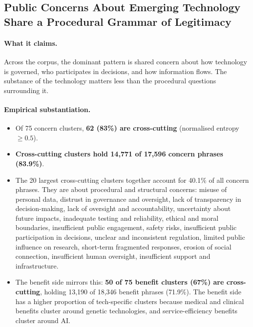 \documentclass[11pt, a4paper]{article}
\begin{document}
\subsection{Public Concerns About Emerging Technology Share a Procedural
Grammar of Legitimacy}

\paragraph{What it claims.}  Across the corpus, the dominant pattern is
shared concern about how technology is governed, who participates in
decisions, and how information flows.  The substance of the technology
matters less than the procedural questions surrounding it.

\paragraph{Empirical substantiation.}

\begin{itemize}
\item Of 75 concern clusters, \textbf{62 (83\%) are cross-cutting}
      (normalised entropy $\geq 0.5$).
\item \textbf{Cross-cutting clusters hold 14,771 of 17,596 concern
      phrases (83.9\%)}.
\item The 20 largest cross-cutting clusters together account for 40.1\%
      of all concern phrases.  They are about procedural and structural
      concerns: misuse of personal data, distrust in governance and
      oversight, lack of transparency in decision-making, lack of
      oversight and accountability, uncertainty about future impacts,
      inadequate testing and reliability, ethical and moral boundaries,
      insufficient public engagement, safety risks, insufficient public
      participation in decisions, unclear and inconsistent regulation,
      limited public influence on research, short-term fragmented
      responses, erosion of social connection, insufficient human
      oversight, insufficient support and infrastructure.
\item The benefit side mirrors this: \textbf{50 of 75 benefit clusters
      (67\%) are cross-cutting}, holding 13,190 of 18,346 benefit phrases
      (71.9\%).  The benefit side has a higher proportion of tech-specific
      clusters because medical and clinical benefits cluster around
      genetic technologies, and service-efficiency benefits cluster around
      AI\@.
\end{itemize}
\end{document}
